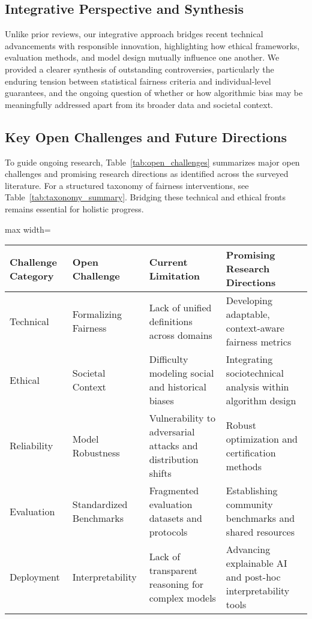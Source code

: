 \documentclass[sigconf]{acmart}
\begin{document}
\subsection{Integrative Perspective and Synthesis}
Unlike prior reviews, our integrative approach bridges recent technical advancements with responsible innovation, highlighting how ethical frameworks, evaluation methods, and model design mutually influence one another. We provided a clearer synthesis of outstanding controversies, particularly the enduring tension between statistical fairness criteria and individual-level guarantees, and the ongoing question of whether or how algorithmic bias may be meaningfully addressed apart from its broader data and societal context.

\subsection{Key Open Challenges and Future Directions}
To guide ongoing research, Table~\ref{tab:open_challenges} summarizes major open challenges and promising research directions as identified across the surveyed literature. For a structured taxonomy of fairness interventions, see Table~\ref{tab:taxonomy_summary}. Bridging these technical and ethical fronts remains essential for holistic progress.

\begin{table*}[htbp]
\centering
\caption{Open Challenges and Future Research Directions in Fairness, Bias, and Reliability}
\label{tab:open_challenges}
\begin{adjustbox}{max width=\textwidth}
\begin{tabular}{@{}llll@{}}
\toprule
Challenge Category & Open Challenge & Current Limitation & Promising Research Directions \\
\midrule
Technical & Formalizing Fairness & Lack of unified definitions across domains & Developing adaptable, context-aware fairness metrics \\
Ethical & Societal Context & Difficulty modeling social and historical biases & Integrating sociotechnical analysis within algorithm design \\
Reliability & Model Robustness & Vulnerability to adversarial attacks and distribution shifts & Robust optimization and certification methods \\
Evaluation & Standardized Benchmarks & Fragmented evaluation datasets and protocols & Establishing community benchmarks and shared resources \\
Deployment & Interpretability & Lack of transparent reasoning for complex models & Advancing explainable AI and post-hoc interpretability tools \\
\bottomrule
\end{tabular}
\end{adjustbox}
\end{table*}
\end{document}
